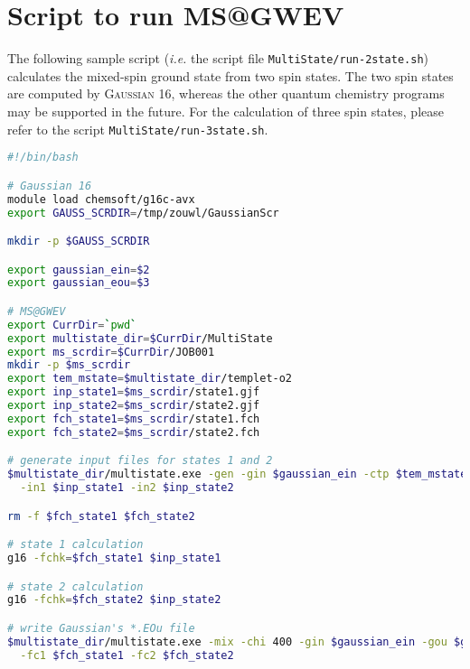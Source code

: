 \documentclass[UTF8]{article}
\begin{document}
\section{Script to run MS@GWEV}

The following sample script (\textit{i.e.} the script file \verb|MultiState/run-2state.sh|) calculates the mixed-spin ground state from two spin states.
The two spin states are computed by \textsc{Gaussian} 16, whereas the other quantum chemistry programs may be supported in the future.
For the calculation of three spin states, please refer to the script \verb|MultiState/run-3state.sh|.

\begin{lstlisting}[language=bash,morekeywords={module, mkdir}]
#!/bin/bash

# Gaussian 16
module load chemsoft/g16c-avx
export GAUSS_SCRDIR=/tmp/zouwl/GaussianScr

mkdir -p $GAUSS_SCRDIR

export gaussian_ein=$2
export gaussian_eou=$3

# MS@GWEV
export CurrDir=`pwd`
export multistate_dir=$CurrDir/MultiState
export ms_scrdir=$CurrDir/JOB001
mkdir -p $ms_scrdir
export tem_mstate=$multistate_dir/templet-o2
export inp_state1=$ms_scrdir/state1.gjf
export inp_state2=$ms_scrdir/state2.gjf
export fch_state1=$ms_scrdir/state1.fch
export fch_state2=$ms_scrdir/state2.fch

# generate input files for states 1 and 2
$multistate_dir/multistate.exe -gen -gin $gaussian_ein -ctp $tem_mstate \
  -in1 $inp_state1 -in2 $inp_state2

rm -f $fch_state1 $fch_state2

# state 1 calculation
g16 -fchk=$fch_state1 $inp_state1

# state 2 calculation
g16 -fchk=$fch_state2 $inp_state2

# write Gaussian's *.EOu file
$multistate_dir/multistate.exe -mix -chi 400 -gin $gaussian_ein -gou $gaussian_eou \
  -fc1 $fch_state1 -fc2 $fch_state2
\end{lstlisting}
\end{document}
